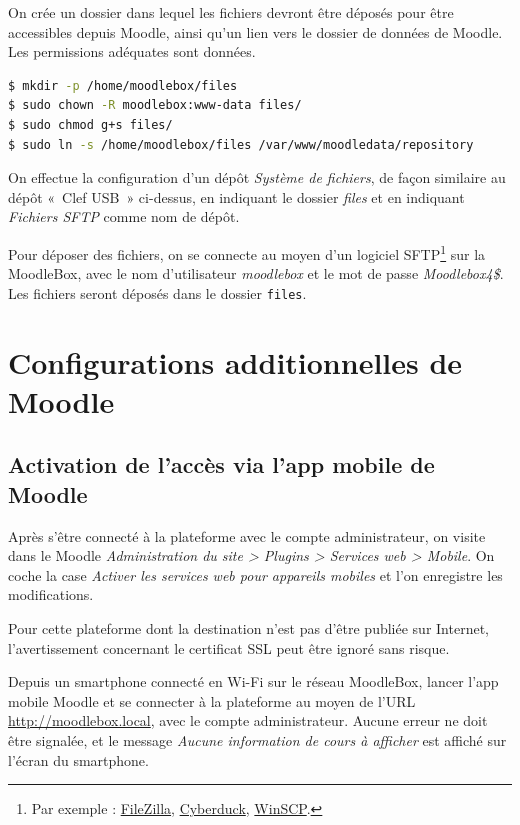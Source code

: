 \documentclass[11pt]{article}
\begin{document}
On crée un dossier dans lequel les fichiers devront être déposés pour être accessibles depuis Moodle, ainsi qu'un lien vers le dossier de données de Moodle. Les permissions adéquates sont données.

\begin{lstlisting}[language=bash]
$ mkdir -p /home/moodlebox/files
$ sudo chown -R moodlebox:www-data files/
$ sudo chmod g+s files/
$ sudo ln -s /home/moodlebox/files /var/www/moodledata/repository
\end{lstlisting}

On effectue la configuration d'un dépôt \emph{Système de fichiers}, de façon similaire au dépôt « Clef USB » ci-dessus, en indiquant le dossier \emph{files} et en indiquant \emph{Fichiers SFTP} comme nom de dépôt.

Pour déposer des fichiers, on se connecte au moyen d'un logiciel SFTP\footnote{Par exemple : \href{https://filezilla-project.org/}{FileZilla}, \href{https://cyberduck.io/}{Cyberduck}, \href{http://winscp.net/}{WinSCP}.} sur la MoodleBox, avec le nom d'utilisateur \emph{moodlebox} et le mot de passe \emph{Moodlebox4\$}. Les fichiers seront déposés dans le dossier \lstinline{files}.

\section{Configurations additionnelles de Moodle}

\subsection{Activation de l'accès via l'app mobile de Moodle}

Après s'être connecté à la plateforme avec le compte administrateur,  on visite dans le Moodle \emph{Administration du site > Plugins > Services web > Mobile}. On coche la case \emph{Activer les services web pour appareils mobiles} et l'on enregistre les modifications.

Pour cette plateforme dont la destination n'est pas d'être publiée sur Internet, l'avertissement concernant le certificat SSL peut être ignoré sans risque.

\begin{verification}
Depuis un smartphone connecté en Wi-Fi sur le réseau MoodleBox, lancer l'app mobile Moodle et se connecter à la plateforme au moyen de l'URL \url{http://moodlebox.local}, avec le compte administrateur. Aucune erreur ne doit être signalée, et le message \emph{Aucune information de cours à afficher} est affiché sur l'écran du smartphone.
\end{verification}
\end{document}
